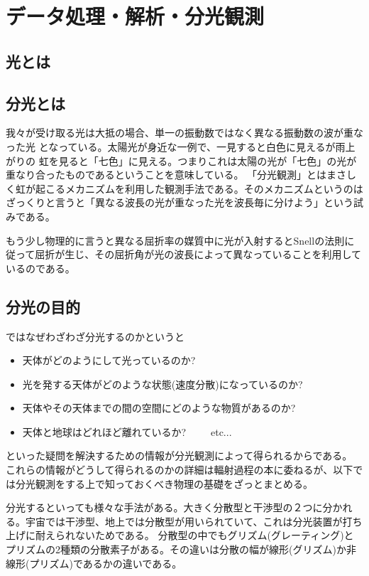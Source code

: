 \chapter{データ処理・解析・分光観測}
\label{chap_4}
    \section{光とは}
    \label{sec_4_1}
    
    \section{分光とは}
    \label{sec_4_2}
    我々が受け取る光は大抵の場合、単一の振動数ではなく異なる振動数の波が重なった光
    となっている。太陽光が身近な一例で、一見すると白色に見えるが雨上がりの
    虹を見ると「七色」に見える。つまりこれは太陽の光が「七色」の光が重なり合ったものであるということを意味している。
    「分光観測」とはまさしく虹が起こるメカニズムを利用した観測手法である。そのメカニズムというのはざっくりと言うと「異なる波長の光が重なった光を波長毎に分けよう」という試みである。
    
    もう少し物理的に言うと異なる屈折率の媒質中に光が入射するとSnellの法則に従って屈折が生じ、その屈折角が光の波長によって異なっていることを利用しているのである。
    \section{分光の目的}
    ではなぜわざわざ分光するのかというと
    \begin{itemize}
        \item 天体がどのようにして光っているのか?
        \item 光を発する天体がどのような状態(速度分散)になっているのか?
        \item 天体やその天体までの間の空間にどのような物質があるのか?
        \item 天体と地球はどれほど離れているか?~~~~~etc...
    \end{itemize}
    といった疑問を解決するための情報が分光観測によって得られるからである。
    これらの情報がどうして得られるのかの詳細は輻射過程の本に委ねるが、以下では分光観測をする上で知っておくべき物理の基礎をざっとまとめる。
    
    
    
    
    
    分光するといっても様々な手法がある。大きく分散型と干渉型の２つに分かれる。宇宙では干渉型、地上では分散型が用いられていて、これは分光装置が打ち上げに耐えられないためである。
    分散型の中でもグリズム(グレーティング)とプリズムの2種類の分散素子がある。その違いは分散の幅が線形(グリズム)か非線形(プリズム)であるかの違いである。
    
